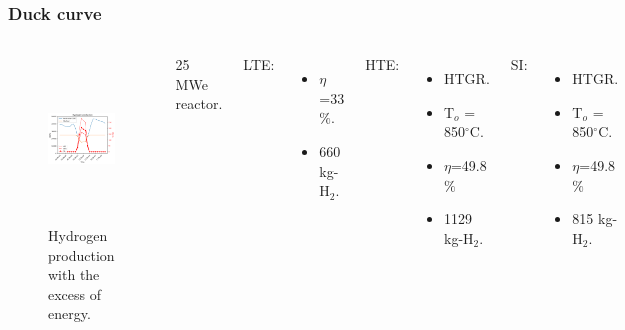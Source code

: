 \begin{frame}
\frametitle{Duck curve}
\begin{columns}
    \column[t]{5.5cm}
	\begin{figure}[htbp!]
		\begin{center}
			\includegraphics[height=4.4cm]{images/uiuc-hydro2B}
		\end{center}
		\caption{Hydrogen production with the excess of energy.}
	\end{figure}

    \column[t]{4.5cm}
    25 MWe reactor. \vspace{0.2cm}

    LTE:
    \begin{itemize}
 		\item $\eta$=33$\%$.
 		\item 660 kg-H$_2$.
 	\end{itemize}

    HTE:
    \begin{itemize}
 		\item HTGR.
 		\item T$_o$ = 850$^\circ$C.
 		\item $\eta$=49.8$\%$
 		\item 1129 kg-H$_2$.
 	\end{itemize}

    SI:
    \begin{itemize}
 		\item HTGR.
 		\item T$_o$ = 850$^\circ$C.
 		\item $\eta$=49.8$\%$
 		\item 815 kg-H$_2$.
 	\end{itemize}

\end{columns}
\end{frame}

